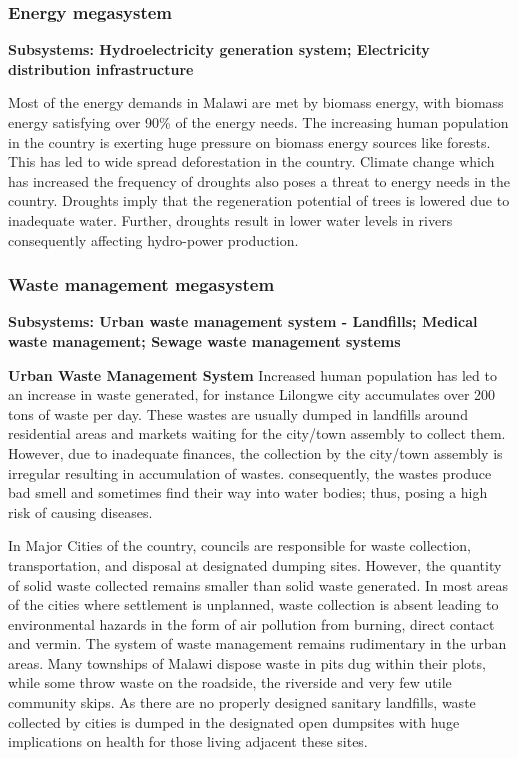 \documentclass[
]{book}
\begin{document}
\hypertarget{energy-megasystem}{%
\subsubsection{Energy megasystem}\label{energy-megasystem}}

\textbf{Subsystems: Hydroelectricity generation system; Electricity distribution infrastructure}

Most of the energy demands in Malawi are met by biomass energy, with biomass energy satisfying over 90\% of the energy needs. The increasing human population in
the country is exerting huge pressure on biomass energy sources like forests. This has led to wide spread deforestation in the country. Climate change which has
increased the frequency of droughts also poses a threat to energy needs in the country. Droughts imply that the regeneration potential of trees is lowered due to
inadequate water. Further, droughts result in lower water levels in rivers consequently affecting hydro-power production.

\hypertarget{waste-management-megasystem}{%
\subsubsection{Waste management megasystem}\label{waste-management-megasystem}}

\textbf{Subsystems: Urban waste management system - Landfills; Medical waste management; Sewage waste management systems}

\textbf{Urban Waste Management System}
Increased human population has led to an increase in waste generated, for instance Lilongwe city accumulates over 200 tons of waste per day. These wastes are
usually dumped in landfills around residential areas and markets waiting for the city/town assembly to collect them. However, due to inadequate finances, the
collection by the city/town assembly is irregular resulting in accumulation of wastes. consequently, the wastes produce bad smell and sometimes find their way
into water bodies; thus, posing a high risk of causing diseases.

In Major Cities of the country, councils are responsible for waste collection, transportation, and disposal at designated dumping sites. However, the quantity of
solid waste collected remains smaller than solid waste generated. In most areas of the cities where settlement is unplanned, waste collection is absent leading
to environmental hazards in the form of air pollution from burning, direct contact and vermin. The system of waste management remains rudimentary in the urban
areas. Many townships of Malawi dispose waste in pits dug within their plots, while some throw waste on the roadside, the riverside and very few utile community
skips. As there are no properly designed sanitary landfills, waste collected by cities is dumped in the designated open dumpsites with huge implications on
health for those living adjacent these sites.
\end{document}
